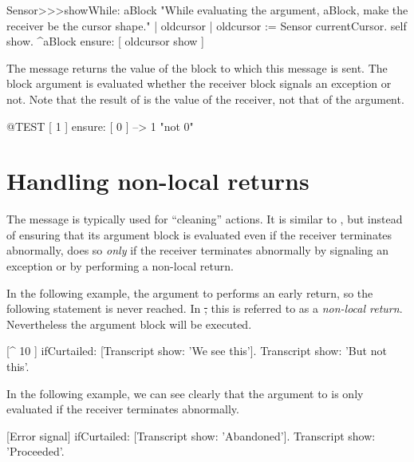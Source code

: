 \documentclass[a4paper,10pt,twoside]{book}
\begin{document}
\begin{code}{}
Sensor>>>showWhile: aBlock 
	"While evaluating the argument, aBlock,
	make the receiver be the cursor shape."
	| oldcursor |
	oldcursor := Sensor currentCursor.
	self show.
	^aBlock ensure: [ oldcursor show ]
\end{code}

The message  returns the value of the block to which this message is sent. The block argument is evaluated whether the receiver block signals an exception or not. Note that the result of  is the value of the receiver, not that of the argument.

\begin{code}{@TEST}
[ 1 ] ensure: [ 0 ] --> 1    "not 0"
\end{code}

\section{Handling non-local returns}

The message  is typically used for ``cleaning'' actions. It is similar to , but instead of ensuring that its argument block is evaluated even if the receiver terminates abnormally,  does so \emph{only} if the receiver terminates abnormally by signaling an exception or by performing a non-local return.

In the following example, the argument to  performs an early return, so the following statement is never reached.
In \st, this is referred to as a \emph{non-local return}.
Nevertheless the argument block will be executed.
\begin{code}{}
[^ 10 ] ifCurtailed: [Transcript show: 'We see this'].
Transcript show: 'But not this'.
\end{code}

In the following example, we can see clearly that the argument to  is only evaluated if the receiver terminates abnormally.
\begin{code}{}
[Error signal] ifCurtailed: [Transcript show: 'Abandoned'].
Transcript show: 'Proceeded'.
\end{code}

\end{document}
